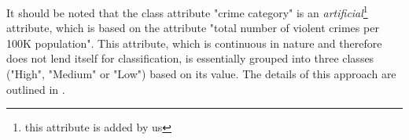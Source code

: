 \noindent It should be noted that the class attribute "crime category" is an \textit{artificial}\footnote{this attribute is added by us}
attribute, which is based on the attribute "total number of violent
crimes per 100K population". This attribute, which is continuous in
nature and therefore does not lend itself for classification, is
essentially grouped into three classes ("High", "Medium" or "Low")
based on its value. The details of this approach are outlined in .


